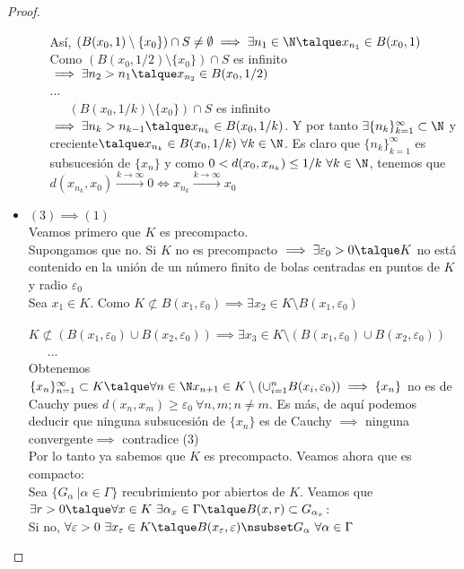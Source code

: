 \begin{teor}
\begin{proof}
\begin{itemize}
\begin{itemize}
	Así, $(B(x_0,1)\setminus\{x_0\})\cap S\neq\emptyset\implies \exists n_1\in\N \talque x_{n_1}\in B(x_0,1)$\\
	Como $(B(x_0, 1/2)\setminus\{x_0\})\cap S$ es infinito $\implies \exists n_2>n_1 \talque x_{n_2}\in B(x_0,1/2)$\\
	...\\
	\ \ \ $(B(x_0, 1/k)\setminus\{x_0\})\cap S$ es infinito $\implies \exists n_k>n_{k-1} \talque x_{n_k}\in B(x_0,1/k)$. Y por tanto $\exists\{n_k\}^\infty_{k=1} \subset\N$ y creciente$\talque x_{n_k} \in B(x_0,1/k)\ \forall k\in\N$. Es claro que $\{n_k\}^\infty_{k=1}$ es subsucesión de $\{x_n\}$ y como $0<d(x_0,x_{n_k})\leq 1/k\ \forall k\in\N$, tenemos que \\
	$d(x_{n_k},x_0)\xrightarrow{k\rightarrow\infty}0 \iff x_{n_k}\xrightarrow{k\rightarrow\infty}x_0$
					\end{itemize}
				\item $(3)\implies(1)$ \\
	Veamos primero que $K$ es precompacto.\\
	Supongamos que no. Si $K$ no es precompacto $\implies \exists \varepsilon_0>0\talque K$ no está contenido en la unión de un número finito de bolas centradas en puntos de $K$ y radio $\varepsilon_0$\\
	Sea $x_1\in K$. Como $K\not\subset B(x_1,\varepsilon_0)\implies \exists x_2\in K\setminus B(x_1,\varepsilon_0)$\\
	\ \ \ $K\not\subset (B(x_1,\varepsilon_0)\cup B(x_2,\varepsilon_0))\implies\exists x_3\in K\setminus (B(x_1,\varepsilon_0)\cup B(x_2,\varepsilon_0))$\\
	\ \ \ ...\\
	Obtenemos $\{x_n\}^\infty_{n=1}\subset K \talque \forall n\in\N x_{n+1}\in K\setminus(\cup^n_{i=1}B(x_i,\varepsilon_0))\implies \{x_n\}$ no es de Cauchy pues $d(x_n,x_m) \geq \varepsilon_0\ \forall n,m; n\neq m.$ Es más, de aquí podemos deducir que ninguna subsucesión de $\{x_n\}$ es de Cauchy $\implies$ ninguna convergente$\implies$ contradice (3)\\
	Por lo tanto ya sabemos que $K$ es precompacto. Veamos ahora que es compacto:\\
	Sea $\{G_\alpha\ | \alpha\in\Gamma\}$ recubrimiento por abiertos de $K$. Veamos que\\
	 $\exists r>0\talque \forall x\in K\ \exists \alpha_x\in\Gamma \talque B(x,r)\subset G_{\alpha_x}$:\\
	 Si no, $\forall\varepsilon>0\ \exists x_\varepsilon\in K\talque B(x_\varepsilon,\varepsilon) \nsubset G_\alpha\ \forall\alpha\in\Gamma$\\

\end{itemize}
\end{proof}
\end{teor}
